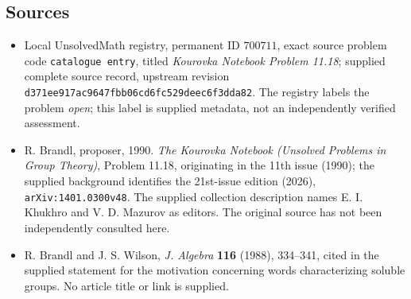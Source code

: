\documentclass[11pt]{article}
\begin{document}
\subsection{Sources}
\begin{itemize}
\item Local UnsolvedMath registry, permanent ID \(700711\), exact source problem code \texttt{catalogue entry}, titled \emph{Kourovka Notebook Problem 11.18}; supplied complete source record, upstream revision \texttt{d371ee917ac9647fbb06cd6fc529deec6f3dda82}. The registry labels the problem \emph{open}; this label is supplied metadata, not an independently verified assessment.
\item R. Brandl, proposer, 1990. \emph{The Kourovka Notebook (Unsolved Problems in Group Theory)}, Problem 11.18, originating in the 11th issue (1990); the supplied background identifies the 21st-issue edition (2026), \texttt{arXiv:1401.0300v48}. The supplied collection description names E. I. Khukhro and V. D. Mazurov as editors. The original source has not been independently consulted here.
\item R. Brandl and J. S. Wilson, \emph{J. Algebra} \textbf{116} (1988), 334--341, cited in the supplied statement for the motivation concerning words characterizing soluble groups. No article title or link is supplied.
\end{itemize}
\end{document}
